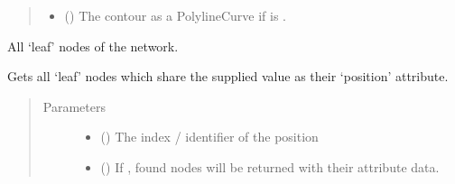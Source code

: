 \documentclass[letterpaper,10pt,english]{sphinxmanual}
\begin{document}
\begin{fulllineitems}
\begin{fulllineitems}
\begin{quote}
\begin{description}
\begin{itemize}
\item {} 
 () \textendash{} The contour as a PolylineCurve if  is .

\end{itemize}


\end{description}\end{quote}

\end{fulllineitems}


\begin{fulllineitems}
\label{\detokenize{cockatoo:cockatoo.KnitNetworkBase.leaf_nodes}}
All ‘leaf’ nodes of the network.

\end{fulllineitems}


\begin{fulllineitems}
\label{\detokenize{cockatoo:cockatoo.KnitNetworkBase.leaves_on_position}}
Gets all ‘leaf’ nodes which share the supplied value as their
‘position’ attribute.
\begin{quote}\begin{description}
\item[{Parameters}] \leavevmode\begin{itemize}
\item {} 
 () \textendash{} The index / identifier of the position

\item {} 
 (\sphinxstyleliteralemphasis{\sphinxupquote{, }}) \textendash{} 
If , found nodes will be returned with their attribute
data.


\end{itemize}
\end{description}
\end{quote}
\end{fulllineitems}
\end{fulllineitems}
\end{document}
